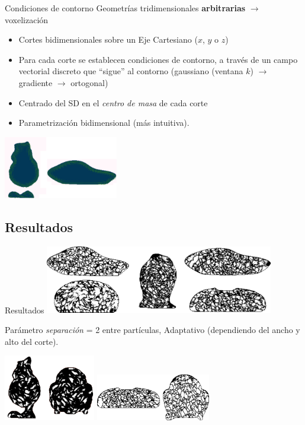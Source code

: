 \documentclass[spanish,unknownkeysallowed,10pt]{beamer}
\begin{document}
\begin{frame}{Condiciones de contorno}
Geometrías tridimensionales \textbf{arbitrarias} $\rightarrow$ voxelización

\begin{itemize}
\item Cortes bidimensionales sobre un Eje Cartesiano ($x$, $y$ o $z$)
\item Para cada corte se establecen condiciones de contorno, a través de un campo vectorial discreto que ``sigue'' al contorno (gaussiano (ventana $k$) $\rightarrow$ gradiente $\rightarrow$ ortogonal)
\item Centrado del SD en el {\em centro de masa} de cada corte
\item Parametrización bidimensional (más intuitiva).

\end{itemize}

  \centerline{\includegraphics[width=5cm]{../figures/Fig4}}
\end{frame}


\subsection{Resultados}

\begin{frame}{Resultados}
\includegraphics[width=10cm]{../figures/Fig5}

Parámetro {\em separación} = 2 entre partículas, Adaptativo (dependiendo del ancho y alto del corte).

\includegraphics[width=4cm]{../figures/Fig7}
\includegraphics[width=5cm]{../figures/Fig6}





\end{frame}
\end{document}
